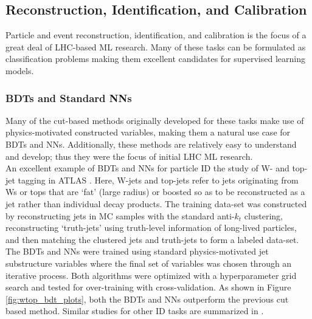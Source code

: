 \subsection{Reconstruction, Identification, and Calibration}
Particle and event reconstruction, identification, and calibration is the focus of a great deal of LHC-based ML research. Many of these tasks can be formulated as classification problems making them excellent candidates for supervised learning models. 

\subsubsection{BDTs and Standard NNs}
Many of the cut-based methods originally developed for these tasks make use of physics-motivated constructed variables, making them a natural use case for BDTs and NNs. Additionally, these methods are relatively easy to understand and develop; thus they were the focus of initial LHC ML research.\\

An excellent example of BDTs and NNs for particle ID the study of W- and top-jet tagging in ATLAS \cite{w_top_bdt_paper}. Here, W-jets and top-jets refer to jets originating from Ws or tops that are `fat' (large radius) or boosted so as to be reconstructed as a jet rather than individual decay products. The training data-set was constructed by reconstructing jets in MC samples with the standard anti-$k_t$ clustering, reconstructing `truth-jets' using truth-level information of long-lived particles, and then matching the clustered jets and truth-jets to form a labeled data-set. The BDTs and NNs were trained using standard physics-motivated jet substructure variables where the final set of variables was chosen through an iterative process. Both algorithms were optimized with a hyperparameter grid search and tested for over-training with cross-validation. As shown in Figure \ref{fig:wtop_bdt_plots}, both the BDTs and NNs outperform the previous cut based method. Similar studies for other ID tasks are summarized in \cite{ben_jet_paper}.\\ 

